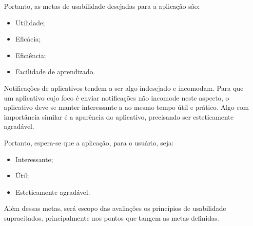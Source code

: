       Portanto, as metas de usabilidade desejadas para a aplicação são:
      
      \begin{itemize}
	\item Utilidade;
	\item Eficácia;
	\item Eficiência;
	\item Facilidade de aprendizado.
      \end{itemize}
          
      Notificações de aplicativos tendem a ser algo indesejado e incomodam. Para que um aplicativo cujo foco é enviar notificações
      não incomode neste aspecto, o aplicativo deve se manter interessante a ao mesmo tempo útil e prático. Algo com importância similar
      é a aparência do aplicativo, precisando ser esteticamente agradável.
      
      Portanto, espera-se que a aplicação, para o usuário, seja:
      
      \begin{itemize}
       \item Interessante;
       \item Útil;
       \item Esteticamente agradável.
      \end{itemize}
      
      Além dessas metas, será escopo das avaliações os princípios de usabilidade supracitados, principalmente nos pontos que tangem as 
      metas definidas.

      
    